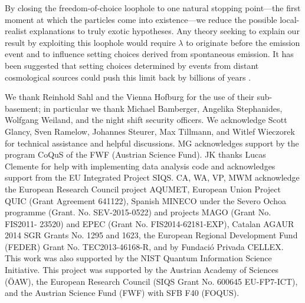 \documentclass[superscriptaddress,twocolumn]{revtex4-1}
\begin{document}
By closing the freedom-of-choice loophole to one natural stopping point---the first moment at which the particles come into existence---we reduce the possible local-realist explanations to truly exotic hypotheses.
Any theory seeking to explain our result by exploiting this loophole would require $\lambda$ to originate before the emission event and to influence setting choices derived from spontaneous emission.
It has been suggested that setting choices determined by events from distant cosmological sources could push this limit back by billions of years \cite{Gallicchio2014}. 

\vspace{2ex}
We thank Reinhold Sahl and the Vienna Hofburg for the use of their sub-basement; in particular we thank Michael Bamberger, Angelika Stephanides, Wolfgang Weiland, and the night shift security officers. We acknowledge Scott Glancy, Sven Ramelow, Johannes Steurer, Max Tillmann, and Witlef Wieczorek for technical assistance and helpful discussions. MG acknowledges support by the program CoQuS of the FWF (Austrian Science Fund).
JK thanks Lucas Clemente for help with implementing data analysis code and acknowledges support from the EU Integrated Project SIQS. CA, WA, VP, MWM acknowledge the European Research Council project AQUMET, European Union Project QUIC (Grant Agreement 641122), Spanish MINECO under the Severo Ochoa programme (Grant. No.  SEV-2015-0522) and projects MAGO (Grant No. FIS2011- 23520) and EPEC (Grant No. FIS2014-62181-EXP), Catalan AGAUR 2014 SGR Grants No. 1295 and 1623, the European Regional Development Fund (FEDER) Grant No. TEC2013-46168-R, and by Fundaci\'o Privada CELLEX. This work was also supported by the NIST Quantum Information Science Initiative. This project was supported by the Austrian Academy of Sciences ({\"O}AW), the European Research Council (SIQS Grant No. 600645 EU-FP7-ICT), and the Austrian Science Fund (FWF) with SFB F40 (FOQUS).


% 


	
\end{document}
